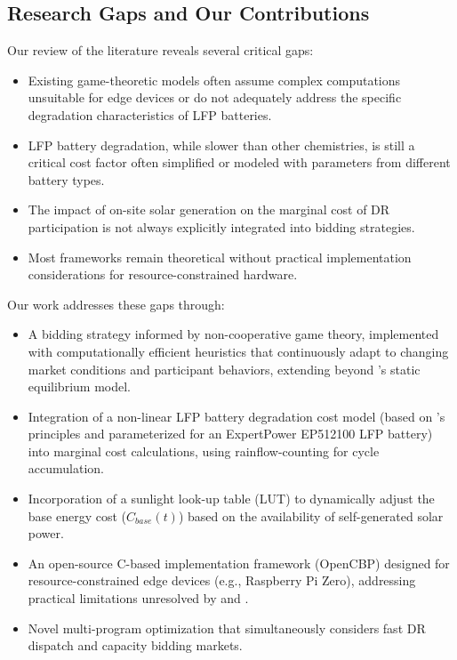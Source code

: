 \documentclass[11pt,a4paper]{article}
\begin{document}
\subsection{Research Gaps and Our Contributions}
Our review of the literature reveals several critical gaps:
\begin{itemize}
    \item Existing game-theoretic models often assume complex computations unsuitable for edge devices or do not adequately address the specific degradation characteristics of LFP batteries.
    \item LFP battery degradation, while slower than other chemistries, is still a critical cost factor often simplified or modeled with parameters from different battery types.
    \item The impact of on-site solar generation on the marginal cost of DR participation is not always explicitly integrated into bidding strategies.
    \item Most frameworks remain theoretical without practical implementation considerations for resource-constrained hardware.
\end{itemize}

Our work addresses these gaps through:
\begin{itemize}
    \item A bidding strategy informed by non-cooperative game theory, implemented with computationally efficient heuristics that continuously adapt to changing market conditions and participant behaviors, extending beyond \citet{Nekouei2015}'s static equilibrium model.
    \item Integration of a non-linear LFP battery degradation cost model (based on \citet{Millner2010}'s principles and parameterized for an ExpertPower EP512100 LFP battery) into marginal cost calculations, using rainflow-counting for cycle accumulation.
    \item Incorporation of a sunlight look-up table (LUT) to dynamically adjust the base energy cost ($C_{base}(t)$) based on the availability of self-generated solar power.
    \item An open-source C-based implementation framework (OpenCBP) designed for resource-constrained edge devices (e.g., Raspberry Pi Zero), addressing practical limitations unresolved by \citet{Iria2019} and \citet{Lakshmanan2021}.
    \item Novel multi-program optimization that simultaneously considers fast DR dispatch and capacity bidding markets.
\end{itemize}
\end{document}

